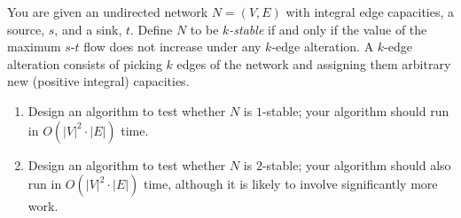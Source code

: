 \documentclass[a4paper,11pt]{book}
\newcounter{problem}
\begin{document}
\bigskip\noindent
You are given an undirected network $N=(V, E)$ with integral edge capacities,
a source, $s$, and a sink, $t$.
Define $N$ to be \emph{$k$-stable} if and only if the value of the maximum
$s$-$t$ flow does not increase under any $k$-edge alteration.  A $k$-edge
alteration consists of picking $k$ edges of the network and assigning them
arbitrary new (positive integral) capacities.
\begin{enumerate}
  \item
    Design an algorithm to test whether $N$ is $1$-stable; your
    algorithm should run in $O(|V|^2 \cdot |E|)$ time.
  \item
    Design an algorithm to test whether $N$ is $2$-stable; your
    algorithm should also run in $O(|V|^2 \cdot |E|)$ time,
    although it is likely to involve significantly more work.
\end{enumerate}

\medskip

\end{document}
